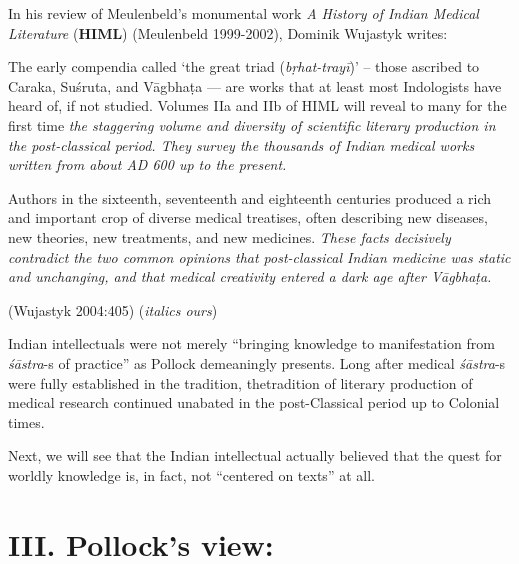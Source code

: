 In his review of Meulenbeld's monumental work {\sl A History of Indian Medical Literature} ({\bf HIML}) (Meulenbeld 1999-2002), Dominik Wujastyk writes:
\begin{myquote}
The early compendia called `the great triad ({\sl bṛhat-trayī})' -- those ascribed to Caraka, Suśruta, and Vāgbhaṭa --- are works that at least most Indologists have heard of, if not studied. Volumes IIa and IIb of HIML will reveal to many for the first time {\sl the staggering volume and diversity of scientific literary production in the post-classical period. They survey the thousands of Indian medical works written from about AD 600 up to the present.} 

Authors in the sixteenth, seventeenth and eighteenth centuries produced a rich and important crop of diverse medical treatises, often describing new diseases, new theories, new treatments, and new medicines. {\sl These facts decisively contradict the two common opinions that post-classical Indian medicine was static and unchanging, and that medical creativity entered a dark age after Vāgbhaṭa.} 

\hfill (Wujastyk 2004:405) ({\sl italics ours})
\end{myquote}

Indian intellectuals were not merely ``bringing knowledge to manifestation from {\sl śāstra}-s of practice'' as Pollock demeaningly presents.  Long after medical {\sl śāstra}-s were fully established in the tradition, the\break tradition of literary production of medical research continued unabated in the post-Classical period up to Colonial times.

Next, we will see that the Indian intellectual actually believed that the quest for worldly knowledge is, in fact, not ``centered on texts'' at all.

\section*{III. Pollock's view:}

